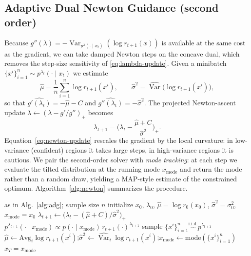 \documentclass{article}
\DeclareMathOperator{\Var}{Var}
\newcommand{\qlam}{p^{\lambda}(\cdot\mid x_t)}
\begin{document}
\subsection{Adaptive Dual Newton Guidance (second order)}
Because $g''(\lambda)=-\Var_{\qlam}(\log r_{t+1}(x))$ is available at the same cost as the gradient, we can take damped Newton steps on the concave dual, which removes the step-size sensitivity of \eqref{eq:lambda-update}. Given a minibatch $\{x^i\}_{i=1}^n\sim p^{\lambda_t}(\cdot\mid x_t)$ we estimate
\begin{equation}
\widehat\mu=\frac1n\sum_{i=1}^n\log r_{t+1}(x^i),
\qquad
\widehat\sigma^2=\widehat{\Var}\big(\log r_{t+1}(x^i)\big),
\end{equation}
so that $\widehat{g'(\lambda_t)}=-\widehat\mu-C$ and $\widehat{g''(\lambda_t)}=-\widehat\sigma^2$. The projected Newton-ascent update $\lambda\!\leftarrow\!(\lambda-g'/g'')_+$ becomes
\begin{equation}
\label{eq:newton-update}
\lambda_{t+1}=\Big(\lambda_t-\frac{\widehat\mu+C}{\widehat\sigma^2}\Big)_{+}.
\end{equation}
Equation~\eqref{eq:newton-update} rescales the gradient by the local curvature: in low-variance (confident) regions it takes large steps, in high-variance regions it is cautious. We pair the second-order solver with \emph{mode tracking}: at each step we evaluate the tilted distribution at the running mode $x_{\mathrm{mode}}$ and return the mode rather than a random draw, yielding a MAP-style estimate of the constrained optimum. Algorithm~\ref{alg:newton} summarizes the procedure.

\begin{algorithm}[t]
\caption{Adaptive Dual Newton Guidance}
\label{alg:newton}
\begin{algorithmic}[1]
\Require as in Alg.~\ref{alg:adg}; sample size $n$
\State initialize $x_0$, $\lambda_0$, $\widehat\mu=\log r_0(x_0)$, $\widehat\sigma^2=\sigma_0^2$, $x_{\mathrm{mode}}=x_0$
  \State $\lambda_{t+1}\gets\big(\lambda_t-(\widehat\mu+C)/\widehat\sigma^2\big)_+$ 
  \State $p^{\lambda_{t+1}}(\cdot\mid x_{\mathrm{mode}})\propto p(\cdot\mid x_{\mathrm{mode}})\,r_{t+1}(\cdot)^{\lambda_{t+1}}$
  \State sample $\{x^i\}_{i=1}^n\stackrel{\text{i.i.d.}}{\sim}p^{\lambda_{t+1}}$
  \State $\widehat\mu\gets\mathrm{Avg}_i\log r_{t+1}(x^i)$;\quad $\widehat\sigma^2\gets\widehat{\Var}_i\log r_{t+1}(x^i)$;\quad $x_{\mathrm{mode}}\gets\mathrm{mode}(\{x^i\}_{i=1}^n)$
\EndFor
\State \Return $x_T=x_{\mathrm{mode}}$
\end{algorithmic}
\end{algorithm}
\end{document}
